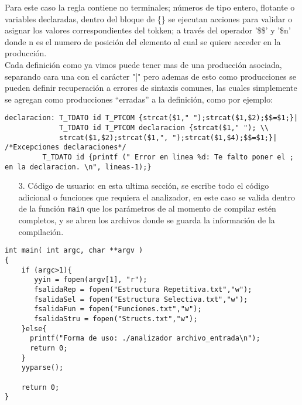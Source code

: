 \documentclass[spanish]{article}
\begin{document}
Para este caso la regla contiene no terminales; números de tipo entero, flotante o variables declaradas,  dentro del bloque de \{\} se ejecutan acciones para validar o asignar los valores correspondientes del tokken; a través del operador '\$\$' y '\$n' donde n es el numero de posición del elemento al cual se quiere acceder en la producción.\\

Cada definición como ya vimos puede tener mas de una producción asociada, separando cara una con el carácter "|" pero ademas de esto como producciones se pueden definir recuperación a errores de sintaxis comunes, las cuales simplemente se agregan como producciones “erradas” a la definición, como por ejemplo: 

\begin{lstlisting}
declaracion: T_TDATO id T_PTCOM	{strcat($1," ");strcat($1,$2);$$=$1;}|
             T_TDATO id T_PTCOM declaracion	{strcat($1," "); \\
             strcat($1,$2);strcat($1,", ");strcat($1,$4);$$=$1;}|
/*Excepciones declaraciones*/
         T_TDATO id {printf (" Error en linea %d: Te falto poner el ;  en la declaracion. \n", lineas-1);}             
\end{lstlisting}

\begin{enumerate}
\item[3.]Código de usuario: en esta ultima sección, se escribe todo el código adicional o funciones que requiera el analizador, en este caso se valida dentro de la función \texttt{main} que los parámetros de al momento de compilar estén completos, y se abren los archivos donde se guarda la información de la compilación.
\end{enumerate}
\begin{lstlisting}
int main( int argc, char **argv )
{
	if (argc>1){	
	   yyin = fopen(argv[1], "r");
	   fsalidaRep = fopen("Estructura Repetitiva.txt","w");
	   fsalidaSel = fopen("Estructura Selectiva.txt","w");
  	   fsalidaFun = fopen("Funciones.txt","w");
	   fsalidaStru = fopen("Structs.txt","w");
	}else{
	  printf("Forma de uso: ./analizador archivo_entrada\n");
	  return 0;
	}
	yyparse();

	return 0;
}
\end{lstlisting}
\end{document}

